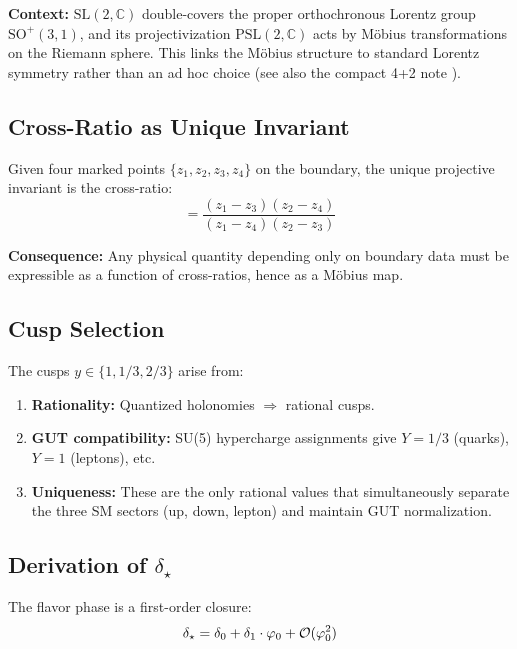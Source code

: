 \begin{remark}
\textbf{Context:} $\mathrm{SL}(2,\mathbb{C})$ double-covers the proper orthochronous Lorentz group $\mathrm{SO}^+(3,1)$, 
and its projectivization $\mathrm{PSL}(2,\mathbb{C})$ acts by M\"obius transformations on the Riemann sphere. 
This links the M\"obius structure to standard Lorentz symmetry rather than an ad hoc choice
(see also the compact 4+2 note \cite{fourPlusTwoNote2025}).
\end{remark}

\subsection{Cross-Ratio as Unique Invariant}

Given four marked points $\{z_1, z_2, z_3, z_4\}$ on the boundary, the unique 
projective invariant is the cross-ratio:
\begin{equation}
    [z_1, z_2; z_3, z_4] = \frac{(z_1 - z_3)(z_2 - z_4)}{(z_1 - z_4)(z_2 - z_3)}
\end{equation}

\textbf{Consequence:} Any physical quantity depending only on boundary data must be 
expressible as a function of cross-ratios, hence as a M\"obius map.

\subsection{Cusp Selection}

The cusps $y \in \{1, 1/3, 2/3\}$ arise from:
\begin{enumerate}[leftmargin=1.5em, topsep=2pt, itemsep=1pt]
    \item \textbf{Rationality:} Quantized holonomies $\Rightarrow$ rational cusps.
    \item \textbf{GUT compatibility:} SU(5) hypercharge assignments give 
        $Y = 1/3$ (quarks), $Y = 1$ (leptons), etc.
    \item \textbf{Uniqueness:} These are the only rational values that simultaneously 
        separate the three SM sectors (up, down, lepton) and maintain GUT normalization.
\end{enumerate}

\subsection{\texorpdfstring{Derivation of $\delta_\star$}{Derivation of delta_star}}

The flavor phase is a first-order closure:
\begin{equation}
    \delta_\star = \delta_0 + \delta_1 \cdot \varphi_0 + \mathcal{O}(\varphi_0^2)
\end{equation}

